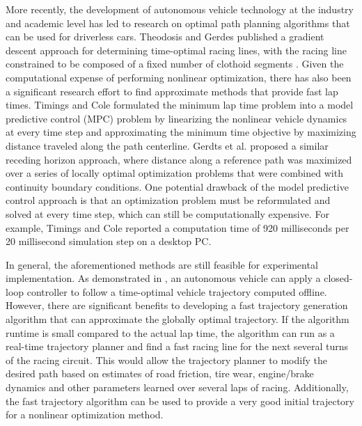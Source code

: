 \documentclass[twocolumn,10pt, final]{asme2e}
\begin{document}
More recently, the development of autonomous vehicle technology at the industry and academic level has led to research on optimal path
 planning algorithms that can be used for driverless cars. Theodosis and Gerdes published a gradient descent approach for determining time-optimal
  racing lines, with the racing line constrained to be composed of a fixed number of clothoid segments \cite{theodosis}. Given the computational expense
 of performing nonlinear optimization, there has also been a significant research effort to find approximate methods that provide fast lap times.
 Timings and Cole \cite{timings} formulated the minimum lap time problem into a model predictive control (MPC) problem by linearizing the nonlinear vehicle
 dynamics at every time step and approximating the minimum time objective by maximizing distance traveled along the path centerline. Gerdts et al. 
 \cite{gerdts} proposed a similar receding horizon approach, where distance along a reference path was maximized over a series of locally optimal optimization
 problems that were combined with continuity boundary conditions. One potential drawback of the model predictive control approach is that an optimization
 problem must be reformulated and solved at every time step, which can still be computationally expensive. For example, Timings and Cole reported a computation time of 920 milliseconds
 per 20 millisecond simulation step on a desktop PC.
 
 In general, the aforementioned methods are still feasible for experimental implementation. As demonstrated in \cite{mickgeneral}, 
 an autonomous vehicle  can apply a closed-loop controller to follow a time-optimal vehicle trajectory computed offline. However, there are
 significant benefits to developing a fast trajectory generation algorithm that can approximate the globally optimal trajectory.
 If the algorithm runtime is small compared to the actual lap time, the algorithm can run as a real-time trajectory planner and find a fast racing line 
 for the next several turns of the racing circuit. This would allow the trajectory planner to modify the desired path based on estimates of
 road friction, tire wear, engine/brake dynamics and other parameters learned over several laps of racing. Additionally, the fast trajectory algorithm can
 be used to provide a very good initial trajectory for a nonlinear optimization method.  
  
\end{document}
